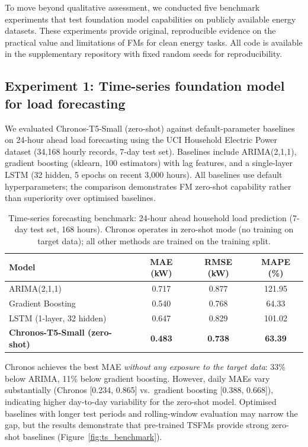 \documentclass[preprint,12pt]{elsarticle}
\begin{document}
To move beyond qualitative assessment, we conducted five benchmark experiments that test foundation model capabilities on publicly available energy datasets. These experiments provide original, reproducible evidence on the practical value and limitations of FMs for clean energy tasks. All code is available in the supplementary repository with fixed random seeds for reproducibility.

\subsection{Experiment 1: Time-series foundation model for load forecasting}
\label{subsec:exp_ts}

{ We evaluated Chronos-T5-Small \cite{ansari2024chronos} (zero-shot) against default-parameter baselines on 24-hour ahead load forecasting using the UCI Household Electric Power dataset (34{,}168 hourly records, 7-day test set). Baselines include ARIMA(2,1,1), gradient boosting (sklearn, 100 estimators) with lag features, and a single-layer LSTM (32 hidden, 5 epochs on recent 3{,}000 hours). All baselines use default hyperparameters; the comparison demonstrates FM zero-shot capability rather than superiority over optimised baselines.\par}

\begin{table}[H]
\centering
\caption{Time-series forecasting benchmark: 24-hour ahead household load prediction (7-day test set, 168 hours). Chronos operates in zero-shot mode (no training on target data); all other methods are trained on the training split.}
\label{tab:ts_benchmark}
\small
\begin{tabular}{@{}lccc@{}}
\toprule
\textbf{Model} & \textbf{MAE (kW)} & \textbf{RMSE (kW)} & \textbf{MAPE (\%)} \\
\midrule
ARIMA(2,1,1) & 0.717 & 0.877 & 121.95 \\
Gradient Boosting & 0.540 & 0.768 & 64.33 \\
LSTM (1-layer, 32 hidden) & 0.647 & 0.829 & 101.02 \\
\textbf{Chronos-T5-Small (zero-shot)} & \textbf{0.483} & \textbf{0.738} & \textbf{63.39} \\
\bottomrule
\end{tabular}
\end{table}

Chronos achieves the best MAE \textit{without any exposure to the target data}: 33\% below ARIMA, 11\% below gradient boosting. However, daily MAEs vary substantially (Chronos [0.234, 0.865] vs.\ gradient boosting [0.388, 0.668]), indicating higher day-to-day variability for the zero-shot model. Optimised baselines with longer test periods and rolling-window evaluation may narrow the gap, but the results demonstrate that pre-trained TSFMs provide strong zero-shot baselines (Figure~\ref{fig:ts_benchmark}).
\end{document}

